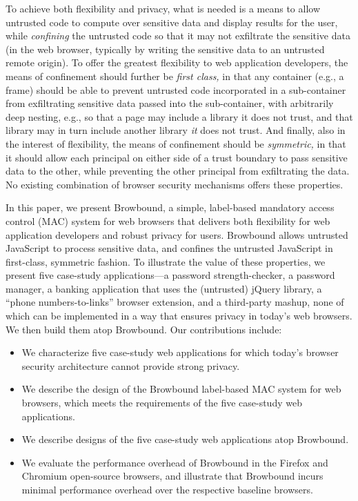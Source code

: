To achieve both flexibility and privacy, what is needed is a means to
allow untrusted code to compute over sensitive data and display
results for the user, while {\em confining} the untrusted code so that
it may not exfiltrate the sensitive data (in the web browser,
typically by writing the sensitive data to an untrusted remote
origin). To offer the greatest flexibility to web application
developers, the means of confinement should further be {\em first
  class,} in that any container (e.g., a frame) should be able
to prevent untrusted code incorporated in a sub-container from
exfiltrating sensitive data passed into the sub-container, with
arbitrarily deep nesting, e.g., so that a page may include a
library it does not trust, and that library may in turn include
another library {\em it} does not trust. And finally, also in the
interest of flexibility, the means of confinement should be {\em
  symmetric,} in that it should allow each principal on either side of
a trust boundary to pass sensitive data to the other, while preventing
the other principal from exfiltrating the data. No existing
combination of browser security mechanisms offers these properties.

In this paper, we present Browbound, a simple, label-based mandatory
access control (MAC) system for web browsers that delivers both
flexibility for web application developers and robust privacy for
users. Browbound allows untrusted JavaScript to process sensitive
data, and confines the untrusted JavaScript in first-class, symmetric
fashion. To illustrate the value of these properties, we present five
case-study applications---a password strength-checker, a password
manager, a banking application that uses the (untrusted) jQuery
library, a ``phone numbers-to-links'' browser extension, and a
third-party mashup, none of which can be implemented in a way that
ensures privacy in today's web browsers. We then build them atop
Browbound. Our contributions include:

\begin{itemize}
\item We characterize five case-study web applications for which
  today's browser security architecture cannot provide strong privacy.
\item We describe the design of the Browbound label-based MAC system
  for web browsers, which meets the requirements of the five
  case-study web applications.
\item We describe designs of the five case-study web applications atop
  Browbound.
\item We evaluate the performance overhead of Browbound in the Firefox
  and Chromium open-source browsers, and illustrate that Browbound
  incurs minimal performance overhead over the respective baseline
  browsers.
\end{itemize}
